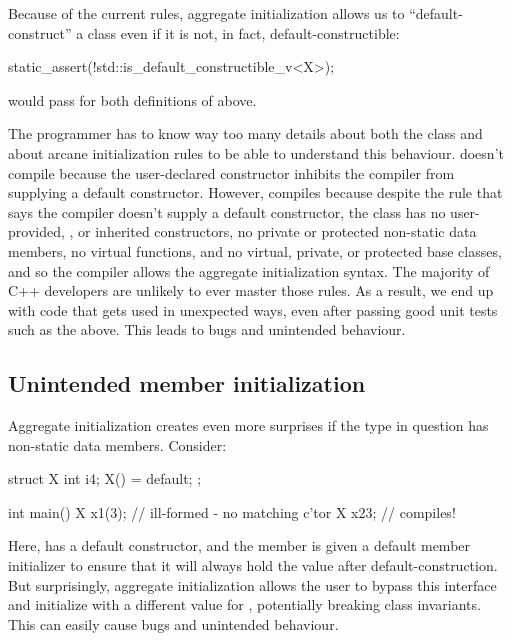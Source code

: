 Because of the current rules, aggregate initialization allows us to ``default-construct'' a class even if it is not, in fact, default-constructible:

\begin{codeblock}
static_assert(!std::is_default_constructible_v<X>);
\end{codeblock}
would pass for both definitions of  above.

The programmer has to know way too many details about both the class and about arcane initialization rules to be able to understand this behaviour.  doesn't compile because the user-declared constructor inhibits the compiler from supplying a default constructor. However,  compiles because despite the rule that says the compiler doesn't supply a default constructor, the class has no user-provided, , or inherited constructors, no private or protected non-static data members, no virtual functions, and no virtual, private, or protected base classes, and so the compiler allows the aggregate initialization syntax. The majority of C++ developers are unlikely to ever master those rules. As a result, we end up with code that gets used in unexpected ways, even after passing good unit tests such as the  above. This leads to bugs and unintended behaviour.


\subsection{Unintended member initialization}
\label{subsec:unintended_init}

Aggregate initialization creates even more surprises if the type in question has non-static data members. Consider:

\begin{codeblock}
struct X {
  int i{4};
  X() = default;
};

int main() {
  X x1(3);  // ill-formed - no matching c'tor
  X x2{3};  // compiles!
}
\end{codeblock}

Here,  has a default constructor, and the member  is given a default member initializer to ensure that it will always hold the value  after default-construction. But surprisingly, aggregate initialization allows the user to bypass this interface and initialize  with a different value for , potentially breaking class invariants. This can easily cause bugs and unintended behaviour.

